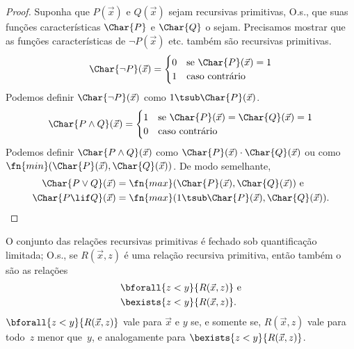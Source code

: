 \documentclass[../../../include/open-logic-section]{subfiles}
\begin{document}
\begin{proof}
  Suponha que $P(\vec x)$ e $Q(\vec x)$ sejam recursivas primitivas, O.s.\@,
  que suas funções características $\Char{P}$ e $\Char{Q}$ o sejam. Precisamos
  mostrar que as funções características de $\lnot P(\vec x)$ etc. também são
  recursivas primitivas.
  \[
  \Char{\lnot P}(\vec x) = \begin{cases}
    0 & \text{se $\Char{P}(\vec x) = 1$}\\
    1 & \text{caso contrário}
  \end{cases}
  \]
  Podemos definir $\Char{\lnot P}(\vec x)$ como $1 \tsub \Char{P}(\vec x)$.
  \[
  \Char{P \land Q}(\vec x) = \begin{cases}
    1 & \text{se $\Char{P}(\vec x) = \Char{Q}(\vec x) = 1$}\\
    0 & \text{caso contrário}
  \end{cases}
  \]
  Podemos definir $\Char{P \land Q}(\vec x)$ como $\Char{P}(\vec x) \cdot
  \Char{Q}(\vec x)$ ou como $\fn{min}(\Char{P}(\vec x), \Char{Q}(\vec
  x))$. De modo semelhante,
  \begin{align*}
    \Char{P \lor Q}(\vec x) & = \fn{max}(\Char{P}(\vec x), \Char{Q}(\vec x)) \text{ e}\\
    \Char{P \lif Q}(\vec x) & = \fn{max}(1 \tsub
  \Char{P}(\vec x), \Char{Q}(\vec x)).
  \end{align*}
\end{proof}

\begin{prop}
  O conjunto das relações recursivas primitivas é fechado sob quantificação
  limitada; O.s.\@, se $R(\vec x, z)$ é uma relação recursiva primitiva,
  então também o são as relações
  \begin{align*}
    & \bforall{z < y}{R(\vec x, z)} \text{ e}\\
    & \bexists{z < y}{R(\vec x, z)}.
  \end{align*}
  $\bforall{z < y}{R(\vec x, z)}$ vale para $\vec x$ e $y$ se, e somente se,
  $R(\vec x, z)$ vale para todo~$z$ menor que~$y$, e analogamente para
  $\bexists{z < y}{R(\vec x, z)}$.
\end{prop}
\end{document}
